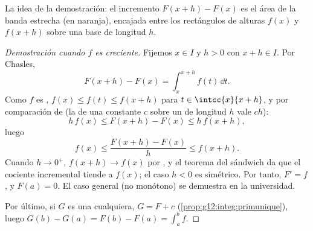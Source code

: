 \begin{omfigure}

{\small La idea de la demostración: el incremento $F(x+h) - F(x)$ es el
área de la banda estrecha (en naranja), encajada entre los rectángulos de
alturas $f(x)$ y $f(x+h)$ sobre una base de longitud $h$.}
\end{omfigure}

\begin{proof}[Demostración cuando $f$ es creciente]
Fijemos $x \in I$ y $h > 0$ con $x + h \in I$. Por Chasles,
\[
F(x+h) - F(x) = \int_x^{x+h} f(t)\,\dd t .
\]
Como $f$ es , $f(x) \leq f(t) \leq f(x+h)$ para
$t \in \intcc{x}{x+h}$, y por comparación de  (la  de una
constante $c$ sobre un  de longitud $h$ vale $ch$):
\[
h\,f(x) \leq F(x+h) - F(x) \leq h\,f(x+h),
\]
luego
\[
f(x) \leq \frac{F(x+h) - F(x)}{h} \leq f(x+h).
\]
Cuando $h \to 0^+$, $f(x+h) \to f(x)$ por , y el teorema del
sándwich da que el cociente incremental tiende a $f(x)$; el caso $h < 0$ es
simétrico. Por tanto, $F' = f$, y $F(a) = 0$. El caso  general (no
monótono) se demuestra en la universidad.

Por último, si $G$ es una  cualquiera, $G = F + c$
(\cref{prop:g12:integ:primunique}), luego
$G(b) - G(a) = F(b) - F(a) = \int_a^b f$.
\end{proof}

